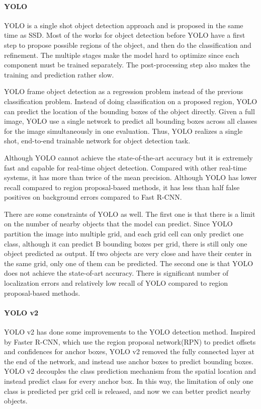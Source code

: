 \paragraph{YOLO}
YOLO is a single shot object detection approach and is proposed in the same time as SSD. Most of the works for object detection before YOLO have a first step to propose possible regions of the object, and then do the classification and refinement. The multiple stages make the model hard to optimize since each component must be trained separately. The post-processing step also makes the training and prediction rather slow.

YOLO  frame object detection as a regression problem instead of the previous classification problem. Instead of doing classification on a proposed region, YOLO can predict the location of the bounding boxes of the object directly. Given a full image, YOLO use a single network to predict all bounding boxes across all classes for the image simultaneously in one evaluation. Thus, YOLO realizes a single shot, end-to-end trainable network for object detection task.

Although YOLO cannot achieve the state-of-the-art accuracy but it is extremely fast and capable for real-time object detection. Compared with other real-time systems, it has more than twice of the mean precision. Although YOLO has lower recall compared to region proposal-based methods, it has less than half false positives on background errors compared to Fast R-CNN.

There are some constraints of YOLO as well. The first one is that there is a limit on the number of nearby objects that the model can predict. Since YOLO partition the image into multiple grid, and each grid cell can only predict one class, although it can predict B bounding boxes per grid, there is still only one object predicted as output. If two objects are very close and have their center in the same grid, only one of them can be predicted. The second one is that YOLO does not achieve the state-of-art accuracy. There is significant number of localization errors and relatively low recall of YOLO compared to region proposal-based methods.

\paragraph{YOLO v2}
YOLO v2 has done some improvements to the YOLO detection method. Inspired by Faster R-CNN, which use the region proposal network(RPN) to predict offsets and confidences for anchor boxes, YOLO v2 removed the fully connected layer at the end of the network, and instead use anchor boxes to predict bounding boxes. YOLO v2 decouples the class prediction mechanism from the spatial location and instead predict class for every anchor box. In this way, the limitation of only one class is predicted per grid cell is released, and now we can better predict nearby objects.

